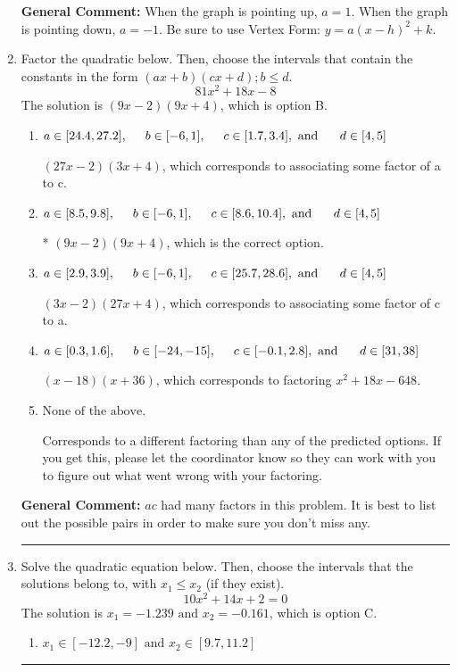 \documentclass{extbook}[14pt]
\newcommand{\litem}[1]{\item #1

\rule{\textwidth}{0.4pt}}
\begin{document}
\begin{enumerate}
{\textbf{General Comment:} When the graph is pointing up, $a=1$. When the graph is pointing down, $a=-1$. Be sure to use Vertex Form: $y = a(x-h)^2+k$.
}
\litem{
Factor the quadratic below. Then, choose the intervals that contain the constants in the form $(ax+b)(cx+d); b \leq d.$
\[ 81x^{2} +18 x -8 \]The solution is \( (9x -2)(9x + 4) \), which is option B.\begin{enumerate}[label=\Alph*.]
\item \( a \in [24.4, 27.2], \hspace*{5mm} b \in [-6, 1], \hspace*{5mm} c \in [1.7, 3.4], \text{ and } \hspace*{5mm} d \in [4, 5] \)

 $(27x -2)(3x + 4)$, which corresponds to associating some factor of a to c.
\item \( a \in [8.5, 9.8], \hspace*{5mm} b \in [-6, 1], \hspace*{5mm} c \in [8.6, 10.4], \text{ and } \hspace*{5mm} d \in [4, 5] \)

* $(9x -2)(9x + 4)$, which is the correct option.
\item \( a \in [2.9, 3.9], \hspace*{5mm} b \in [-6, 1], \hspace*{5mm} c \in [25.7, 28.6], \text{ and } \hspace*{5mm} d \in [4, 5] \)

 $(3x -2)(27x + 4)$, which corresponds to associating some factor of c to a.
\item \( a \in [0.3, 1.6], \hspace*{5mm} b \in [-24, -15], \hspace*{5mm} c \in [-0.1, 2.8], \text{ and } \hspace*{5mm} d \in [31, 38] \)

 $(x -18)(x + 36)$, which corresponds to factoring $x^{2} +18 x -648$.
\item \( \text{None of the above.} \)

 Corresponds to a different factoring than any of the predicted options. If you get this, please let the coordinator know so they can work with you to figure out what went wrong with your factoring.
\end{enumerate}

\textbf{General Comment:} $ac$ had many factors in this problem. It is best to list out the possible pairs in order to make sure you don't miss any.
}
\litem{
Solve the quadratic equation below. Then, choose the intervals that the solutions belong to, with $x_1 \leq x_2$ (if they exist).
\[ 10x^{2} +14 x + 2 = 0 \]The solution is \( x_1 = -1.239 \text{ and } x_2 = -0.161 \), which is option C.\begin{enumerate}[label=\Alph*.]
\item \( x_1 \in [-12.2, -9] \text{ and } x_2 \in [9.7, 11.2] \)


\end{enumerate}}
\end{enumerate}
\end{document}
